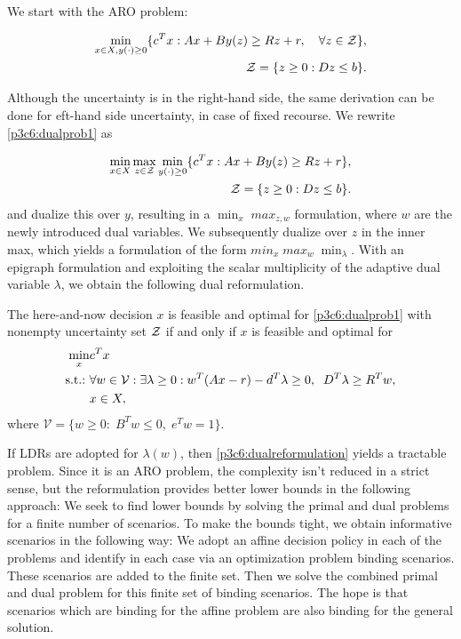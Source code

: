 We start with the ARO problem:

\begin{align}\label{p3c6:dualprob1}
\min\limits_{x\in X,y(\cdot)\geq 0} \{c^Tx: Ax+By(z)\geq Rz+r,\quad\forall z\in\mathcal{Z}\}, \\
\mathcal{Z} = \{z\geq 0 : Dz\leq b\}.
\end{align}

Although the uncertainty is in the right-hand side, the same derivation can be done for eft-hand side uncertainty, in case of fixed recourse. We rewrite \eqref{p3c6:dualprob1} as

\begin{align}\label{p3c6:dualprob2}
\min\limits_{x\in X}\max\limits_{z\in\mathcal{Z}}\min\limits_{y(\cdot)\geq 0} \{c^Tx: Ax+By(z)\geq Rz+r\}, \\
\mathcal{Z} = \{z\geq 0 : Dz\leq b\}.
\end{align}
and dualize this over $y$, resulting in a $\min_x\;max_{z,w}$ formulation, where $w$ are the newly introduced dual variables. We subsequently dualize over $z$ in the inner max, which yields a formulation of the form $min_x\;max_w\;\min_\lambda$. With an epigraph formulation and exploiting the scalar multiplicity of the adaptive dual variable $\lambda$, we obtain the following dual reformulation.

\begin{theorem}
The here-and-now decision $x$ is feasible and optimal for \eqref{p3c6:dualprob1} with nonempty uncertainty set $\mathcal{Z}$ if and only if $x$ is feasible and optimal for 
\begin{align}\label{p3c6:dualreformulation}
\min_x & c^Tx \\
\mathop{\text{s.t.:~}} & \forall w\in \mathcal{V}: \exists \lambda\geq0: w^T(Ax-r)-d^T\lambda\geq 0, \;\; D^T\lambda \geq R^Tw,\\
& x\in X,
\end{align}
where $\mathcal{V} = \{w\geq 0:\; B^Tw\leq 0,\; e^Tw = 1\}.$
\end{theorem}

If LDRs are adopted for $\lambda (w)$, then \eqref{p3c6:dualreformulation} yields a tractable problem. Since it is an ARO problem, the complexity isn't reduced in a strict sense, but the reformulation provides better lower bounds in the following approach: We seek to find lower bounds by solving the primal and dual problems for a finite number of scenarios. To make the bounds tight, we obtain informative scenarios in the following way: We adopt an affine decision policy in each of the problems and identify in each case via an optimization problem binding scenarios. These scenarios are added to the finite set. Then we solve the combined primal and dual problem for this finite set of binding scenarios. The hope is that scenarios which are binding for the affine problem are also binding for the general solution.

